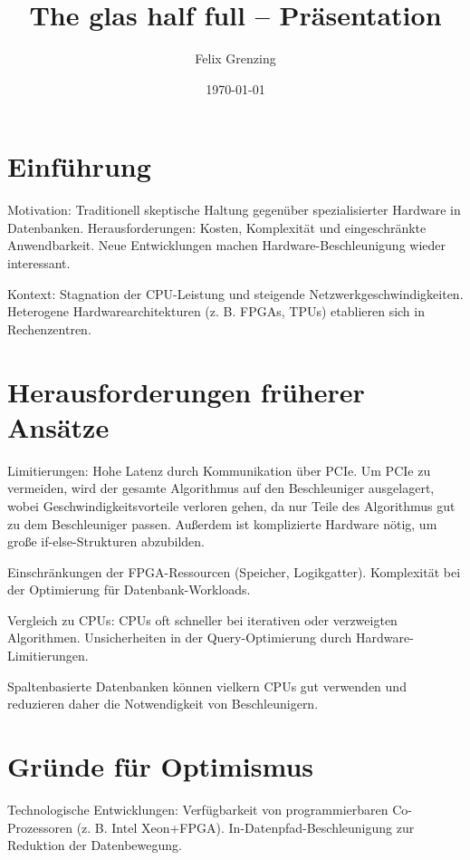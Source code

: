 \documentclass[10pt,a4paper]{article}
\title{The glas half full -- Präsentation}
\author{Felix Grenzing}
\date{\today}
\begin{document}
\maketitle

\section{Einführung}

Motivation:
Traditionell skeptische Haltung gegenüber spezialisierter Hardware in Datenbanken.
Herausforderungen: Kosten, Komplexität und eingeschränkte Anwendbarkeit.
Neue Entwicklungen machen Hardware-Beschleunigung wieder interessant.

Kontext:
Stagnation der CPU-Leistung und steigende Netzwerkgeschwindigkeiten.
Heterogene Hardwarearchitekturen (z. B. FPGAs, TPUs) etablieren sich in Rechenzentren.

\section{Herausforderungen früherer Ansätze}

Limitierungen:
Hohe Latenz durch Kommunikation über PCIe.
Um PCIe zu vermeiden, wird der gesamte Algorithmus auf den Beschleuniger ausgelagert, wobei Geschwindigkeitsvorteile verloren gehen, da
nur Teile des Algorithmus gut zu dem Beschleuniger passen. Außerdem ist komplizierte Hardware nötig, um große if-else-Strukturen abzubilden.

Einschränkungen der FPGA-Ressourcen (Speicher, Logikgatter).
Komplexität bei der Optimierung für Datenbank-Workloads.

Vergleich zu CPUs:
CPUs oft schneller bei iterativen oder verzweigten Algorithmen.
Unsicherheiten in der Query-Optimierung durch Hardware-Limitierungen.

Spaltenbasierte Datenbanken können vielkern CPUs gut verwenden und reduzieren daher die Notwendigkeit von Beschleunigern.

\section{Gründe für Optimismus}

Technologische Entwicklungen:
Verfügbarkeit von programmierbaren Co-Prozessoren (z. B. Intel Xeon+FPGA).
In-Datenpfad-Beschleunigung zur Reduktion der Datenbewegung.
\end{document}
